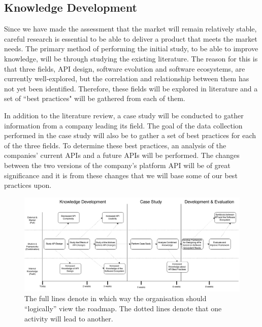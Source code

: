 \documentclass{article}
\begin{document}
\subsection{Knowledge Development}
Since we have made the assessment that the market will remain relatively stable, careful research is essential to be able to deliver a product that meets the market needs. The primary method of performing the initial study, to be able to improve knowledge, will be through studying the existing literature. The reason for this is that three fields, API design, software evolution and software ecosystems, are currently well-explored, but the correlation and relationship between them has not yet been identified. Therefore, these fields will be explored in literature and a set of ``best practices" will be gathered from each of them. \smallskip

In addition to the literature review, a case study will be conducted to gather information from a company leading its field. The goal of the data collection performed in the case study will also be to gather a set of best practices for each of the three fields. To determine these best practices, an analysis of the companies' current APIs and a future APIs will be performed. The changes between the two versions of the company's platform API will be of great significance and it is from these changes that we will base some of our best practices upon. \smallskip

\begin{figure}
\centering
\includegraphics[width=220mm]{RoadMap.png}
\caption{The full lines denote in which way the organisation should ``logically'' view the roadmap. The dotted lines denote that one activity will lead to another. }
\label{fig:roadmap}
\end{figure}
\end{document}
